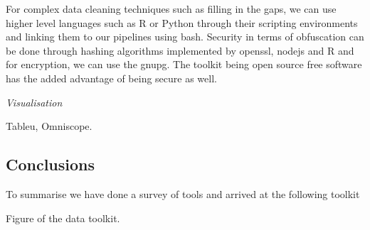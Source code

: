 For complex data cleaning techniques such as filling in the gaps, we can use higher level languages such as R or Python through their scripting environments and linking them to our pipelines using bash.
Security in terms of obfuscation can be done through hashing algorithms implemented by openssl, nodejs and R and for encryption, we can use the gnupg.
The toolkit being open source free software has the added advantage of being secure as well.


\vspace{1.5em}\noindent\textit{Visualisation}\vspace{0.5em}

Tableu, Omniscope.

%

\subsection{Conclusions}

To summarise we have done a survey of tools and arrived at the following toolkit

Figure of the data toolkit.


